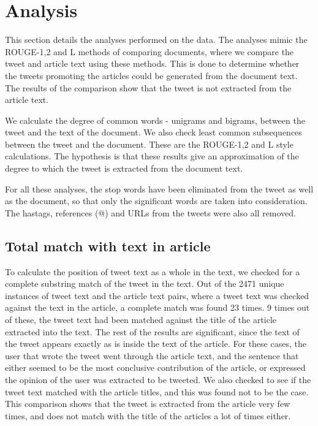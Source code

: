 \section{Analysis}
\label{sec:analysis}

This section details the analyses performed on the data. The analyses mimic the ROUGE-1,2 and L methods of comparing documents, where we compare the tweet and article text using these methods. This is done to determine whether the tweets promoting the articles could be generated from the document text. The results of the comparison show that the tweet is not extracted from the article text. 

We calculate the degree of common words - unigrams and bigrams, between the tweet and the text of the document. We also check least common subsequences between the tweet and the document. These are the ROUGE-1,2 and L style calculations. The hypothesis is that these results give an approximation of the degree to which the tweet is extracted from the document text. 

For all these analyses, the stop words have been eliminated from the tweet as well as the document, so that only the significant words are taken into consideration. The hastags, references (@) and URLs from the tweets were also all removed.

\subsection {Total match with text in article}
To calculate the position of tweet text as a whole in the text, we checked for a complete substring match of the tweet in the text. Out of the 2471 unique instances of tweet text and the article text pairs, where a tweet text was checked against the text in the article, a complete match was found 23 times. 9 times out of these, the tweet text had been matched against the title of the article extracted into the text. The rest of the results are significant, since the text of the tweet appears exactly as is inside the text of the article. For these cases, the user that wrote the tweet went through the article text, and the sentence that either seemed to be the most conclusive contribution of the article, or expressed the opinion of the user was extracted to be tweeted. We also checked to see if the tweet text matched with the article titles, and this was found not to be the case. This comparison shows that the tweet is extracted from the article very few times, and does not match with the title of the articles a lot of times either. 
